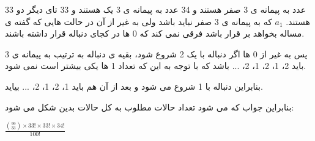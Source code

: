 33 عدد به پیمانه ی 3 صفر هستند و 34 عدد به پیمانه ی 3 یک هستند و 33 تای دیگر دو هستند.
$a_1$ 
که به پیمانه ی 3 صفر نباید باشد ولی به غیر از آن در حالت هایی که گفته ی مساله بخواهد بر قرار باشد فرقی نمی کند که 0 ها در کجای دنباله قرار داشته باشند.

پس به غیر از 0 ها اگر دنباله با یک 2 شروع شود، بقیه ی دنباله به ترتیب به پیمانه ی 3 باید 2، 1، 2، 1، 2، ... باشد که با توجه به این که تعداد 1 ها یکی بیشتر است نمی شود.

بنابراین دنباله با 1 شروع می شود و بعد از آن هم باید 1، 2، 1، 2، ... بیاید.

بنابراین جواب که می شود تعداد حالات مطلوب به کل حالات بدین شکل می شود:

$\frac{\binom{99}{33} \times 33! \times 33! \times 34!}{100!}$